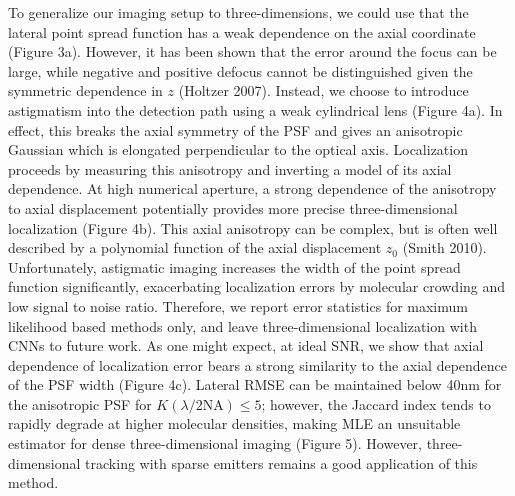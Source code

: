 \documentclass{ucetd}
\begin{document}
To generalize our imaging setup to three-dimensions, we could use that the lateral point spread function has a weak dependence on the axial coordinate (Figure 3a). However, it has been shown that the error around the focus can be large, while negative and positive defocus cannot be distinguished given the symmetric dependence in $z$ (Holtzer 2007). Instead, we choose to introduce astigmatism into the detection path using a weak cylindrical lens (Figure 4a). In effect, this breaks the axial symmetry of the PSF and gives an anisotropic Gaussian which is elongated perpendicular to the optical axis. Localization proceeds by measuring this anisotropy and inverting a model of its axial dependence. At high numerical aperture, a strong dependence of the anisotropy to axial displacement potentially provides more precise three-dimensional localization (Figure 4b).  This axial anisotropy can be complex, but is often well described by a polynomial function of the axial displacement $z_{0}$ (Smith 2010). Unfortunately, astigmatic imaging increases the width of the point spread function significantly, exacerbating localization errors by molecular crowding and low signal to noise ratio. Therefore, we report error statistics for maximum likelihood based methods only, and leave three-dimensional localization with CNNs to future work. As one might expect, at ideal SNR, we show that axial dependence of localization error bears a strong similarity to the axial dependence of the PSF width (Figure 4c). Lateral RMSE can be maintained below 40nm for the anisotropic PSF for $K(\lambda/2\mathrm{NA}) \leq 5$; however, the Jaccard index tends to rapidly degrade at higher molecular densities, making MLE an unsuitable estimator for dense three-dimensional imaging (Figure 5). However, three-dimensional tracking with sparse emitters remains a good application of this method.
\end{document}
